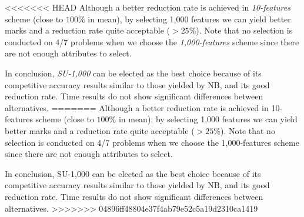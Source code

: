\documentclass[preprint,12pt]{elsarticle}
\begin{document}
\begin{itemize}
<<<<<<< HEAD
Although a better reduction rate is achieved in \textit{10-features} scheme (close to $100\%$ in mean), by selecting 1,000 features we can yield better marks and a reduction rate quite acceptable ($> 25\%$). Note that no selection is conducted on 4/7 problems when we choose the \textit{1,000-features} scheme since there are not enough attributes to select.

In conclusion, \textit{SU-1,000} can be elected as the best choice because of its competitive accuracy results similar to those yielded by NB, and its good reduction rate. Time results do not show significant differences between alternatives.
=======
Although a better reduction rate is achieved in 10-features scheme (close to $100\%$ in mean), by selecting 1,000 features we can yield better marks and a reduction rate quite acceptable ($> 25\%$). Note that no selection is conducted on 4/7 problems when we choose the 1,000-features scheme since there are not enough attributes to select.

In conclusion, SU-1,000 can be elected as the best choice because of its competitive accuracy results similar to those yielded by NB, and its good reduction rate. Time results do not show significant differences between alternatives.
>>>>>>> 04896ff48804e37f4ab79e52c5a19d2310ca1419



\end{itemize}
\end{document}
